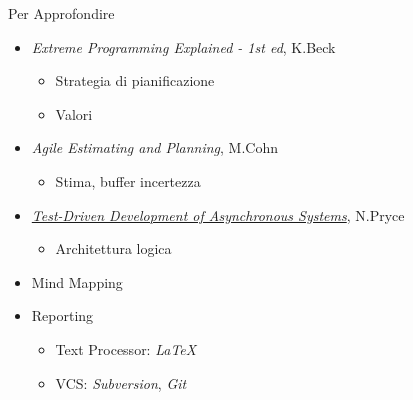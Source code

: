 \documentclass[compress, red, 14pt, pdf]{beamer}
\newcommand{\highlight}[1]{{\color{purple} \emph{#1}}}
\begin{document}
	\begin{frame}{Per Approfondire}
		\begin{itemize}
			\item {\small \highlight{Extreme Programming Explained - 1st ed}, K.Beck}
			\begin{itemize}
				\item Strategia di pianificazione
				\item Valori
			\end{itemize}
			
			\item {\small \highlight{Agile Estimating and Planning}, M.Cohn}
			\begin{itemize}
				\item Stima, buffer incertezza
			\end{itemize}
			
			\item {\footnotesize \highlight{\href{http://www.natpryce.com/articles/000755.html}{Test-Driven Development of Asynchronous Systems}}}{\small , N.Pryce}
				\begin{itemize}
					\item Architettura logica
				\end{itemize}
		\end{itemize}
		
		\begin{itemize}
			\item Mind Mapping
			\item Reporting
			\begin{itemize}
				\item Text Processor: \highlight{LaTeX}
				\item VCS: \highlight{Subversion}, \highlight{Git}
			\end{itemize}
		\end{itemize}
	\end{frame}
\end{document}
